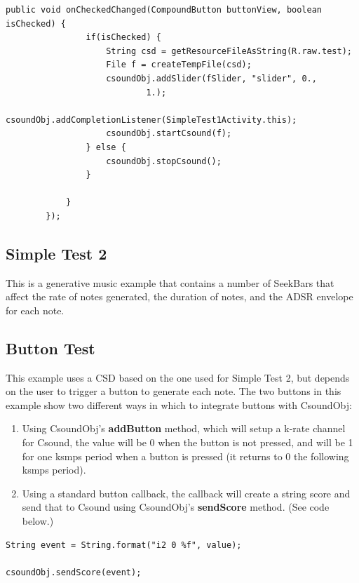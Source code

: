 \documentclass[11pt]{article}
\begin{document}
\begin{lstlisting}[caption=Example code showing configuring and starting a CsoundObj]
public void onCheckedChanged(CompoundButton buttonView, boolean isChecked) {
				if(isChecked) {
					String csd = getResourceFileAsString(R.raw.test);
					File f = createTempFile(csd);
					csoundObj.addSlider(fSlider, "slider", 0.,
							1.);
					csoundObj.addCompletionListener(SimpleTest1Activity.this);
					csoundObj.startCsound(f);
				} else {
					csoundObj.stopCsound();
				}
				
			}
		});
\end{lstlisting}

\subsection{Simple Test 2}

This is a generative music example that contains a number of SeekBars that affect the rate of notes generated, the duration of notes, and the ADSR envelope for each note. 


\subsection{Button Test}

This example uses a CSD based on the one used for Simple Test 2, but depends on the user to trigger a button to generate each note.  The two buttons in this example show two different ways in which to integrate buttons with CsoundObj:

\begin{enumerate}
\item Using CsoundObj's \textbf{addButton} method, which will setup a k-rate channel for Csound, the value will be 0 when the button is not pressed, and will be 1 for one ksmps period when a button is pressed (it returns to 0 the following ksmps period). 
\item Using a standard button callback, the callback will create a string score and send that to Csound using CsoundObj's \textbf{sendScore} method. (See code below.)
\end{enumerate}


\begin{lstlisting}[caption=Example code showing sending score text to CsoundObj]
String event = String.format("i2 0 %f", value);
									
csoundObj.sendScore(event);
\end{lstlisting}
\end{document}
